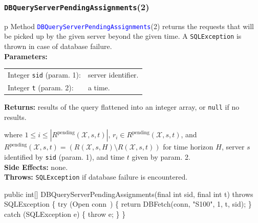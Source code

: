 \documentclass{article}
\def\nwendcode{\endtrivlist \endgroup}      %
\let\nwdocspar=\par
\theoremstyle{definition}                   %
\begin{document}
\subsubsection{{\tt{}\protect{}DBQueryServerPendingAssignments}(2)}
\begin{tabular}{p{\textwidth}}
\toprule
{}
Method \textcolor{blue}{{\tt{}\protect{}DBQueryServerPendingAssignments}}(2) returns the
requests that will be picked up by the given server beyond the given time.
A {\tt{}SQLException} is thrown in case of database failure.\\
\midrule
\textbf{Parameters:} \\
\begin{tabular}{lp{116mm}}
Integer {\tt{}sid} (param. 1):&server identifier.\\
Integer {\tt{}t} (param. 2):&a time.\\
\end{tabular}
\textbf{Returns:} results of the query flattened into an integer array,
or {\tt{}null} if no results.


where $1\leq i\leq |R^\textrm{pending}(\mathcal{X}, s, t)|$,
$r_i\in R^\textrm{pending}(\mathcal{X}, s, t)$, and
$R^\textrm{pending}(\mathcal{X}, s, t)= (R(\mathcal{X},s,H)\setminus R(\mathcal{X},s,t))$ for
time horizon $H$, server $s$ identified by {\tt{}sid} (param. 1), and time $t$ given by param. 2.\\
\textbf{Side Effects:} none.\\
\textbf{Throws:} {\tt{}SQLException} if database failure is encountered.\\
\bottomrule
\end{tabular}
\nwenddocs{}\endmoddef{}
public int[] DBQueryServerPendingAssignments(final int sid, final int t)
throws SQLException \{
  try (\LA{}Open \code{}conn\edoc{}~{\nwtagstyle{}}\RA{}) \{
    return DBFetch(conn, "S100", 1, t, sid);
  \} catch (SQLException e) \{
    throw e;
  \}
\}
\eatline
{}\nwendcode{}\nwdocspar
\end{document}
